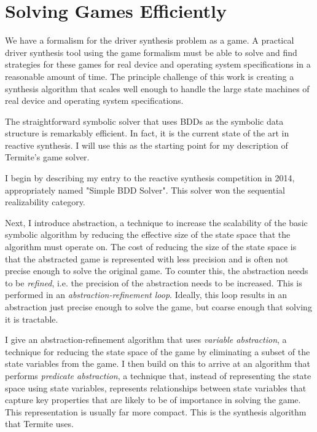 \chapter{Solving Games Efficiently}
\label{ch:solving}

We have a formalism for the driver synthesis problem as a game. A practical driver synthesis tool using the game formalism must be able to solve and find strategies for these games for real device and operating system specifications in a reasonable amount of time. The principle challenge of this work is creating a synthesis algorithm that scales well enough to handle the large state machines of real device and operating system specifications. 

The straightforward symbolic solver that uses BDDs as the symbolic data structure is remarkably efficient. In fact, it is the current state of the art in reactive synthesis. I will use this as the starting point for my description of Termite's game solver.

I begin by describing my entry to the reactive synthesis competition in 2014, appropriately named "Simple BDD Solver". This solver won the sequential realizability category.

Next, I introduce abstraction, a technique to increase the scalability of the basic symbolic algorithm by reducing the effective size of the state space that the algorithm must operate on. The cost of reducing the size of the state space is that the abstracted game is represented with less precision and is often not precise enough to solve the original game. To counter this, the abstraction needs to be \emph{refined}, i.e. the precision of the abstraction needs to be increased. This is performed in an \emph{abstraction-refinement loop}. Ideally, this loop results in an abstraction just precise enough to solve the game, but coarse enough that solving it is tractable.

I give an abstraction-refinement algorithm that uses \emph{variable abstraction}, a technique for reducing the state space of the game by eliminating a subset of the state variables from the game. I then build on this to arrive at an algorithm that performs \emph{predicate abstraction}, a technique that, instead of representing the state space using state variables, represents relationships between state variables that capture key properties that are likely to be of importance in solving the game. This representation is usually far more compact. This is the synthesis algorithm that Termite uses.

